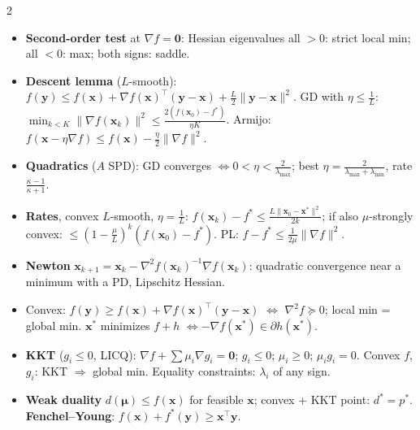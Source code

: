 \documentclass[10pt]{article}
\newcommand{\norm}[1]{\lVert #1 \rVert}
\newcommand{\topic}[1]{\par\smallskip\noindent{\color{blue!50!black}\textbf{#1}}\par}
\begin{document}
\begin{multicols}{2}
\topic{Optimization}
\begin{itemize}
    \item \textbf{Second-order test} at $\nabla f = \mathbf{0}$: Hessian eigenvalues all $> 0$: strict local min; all $< 0$: max; both signs: saddle.
    \item \textbf{Descent lemma} ($L$-smooth): $f(\mathbf{y}) \leq f(\mathbf{x}) + \nabla f(\mathbf{x})^\top(\mathbf{y} - \mathbf{x}) + \frac{L}{2}\norm{\mathbf{y} - \mathbf{x}}^2$. GD with $\eta \leq \frac{1}{L}$: $\min_{k < K}\norm{\nabla f(\mathbf{x}_k)}^2 \leq \frac{2(f(\mathbf{x}_0) - f^*)}{\eta K}$. Armijo: $f(\mathbf{x} - \eta\nabla f) \leq f(\mathbf{x}) - \frac{\eta}{2}\norm{\nabla f}^2$.
    \item \textbf{Quadratics} ($A$ SPD): GD converges $\iff 0 < \eta < \frac{2}{\lambda_{\max}}$; best $\eta = \frac{2}{\lambda_{\max} + \lambda_{\min}}$, rate $\frac{\kappa - 1}{\kappa + 1}$.
    \item \textbf{Rates}, convex $L$-smooth, $\eta = \frac{1}{L}$: $f(\mathbf{x}_k) - f^* \leq \frac{L\norm{\mathbf{x}_0 - \mathbf{x}^*}^2}{2k}$; if also $\mu$-strongly convex: $\leq (1 - \frac{\mu}{L})^k(f(\mathbf{x}_0) - f^*)$. PL: $f - f^* \leq \frac{1}{2\mu}\norm{\nabla f}^2$.
    \item \textbf{Newton} $\mathbf{x}_{k+1} = \mathbf{x}_k - \nabla^2 f(\mathbf{x}_k)^{-1}\nabla f(\mathbf{x}_k)$: quadratic convergence near a minimum with a PD, Lipschitz Hessian.
    \item Convex: $f(\mathbf{y}) \geq f(\mathbf{x}) + \nabla f(\mathbf{x})^\top(\mathbf{y} - \mathbf{x})$ $\iff$ $\nabla^2 f \succeq 0$; local min = global min. $\mathbf{x}^*$ minimizes $f + h$ $\iff -\nabla f(\mathbf{x}^*) \in \partial h(\mathbf{x}^*)$.
    \item \textbf{KKT} ($g_i \leq 0$, LICQ): $\nabla f + \sum\mu_i\nabla g_i = \mathbf{0}$; $g_i \leq 0$; $\mu_i \geq 0$; $\mu_ig_i = 0$. Convex $f$, $g_i$: KKT $\Rightarrow$ global min. Equality constraints: $\lambda_i$ of any sign.
    \item \textbf{Weak duality} $d(\boldsymbol\mu) \leq f(\mathbf{x})$ for feasible $\mathbf{x}$; convex + KKT point: $d^* = p^*$. \textbf{Fenchel--Young}: $f(\mathbf{x}) + f^*(\mathbf{y}) \geq \mathbf{x}^\top\mathbf{y}$.
\end{itemize}


\end{multicols}
\end{document}
